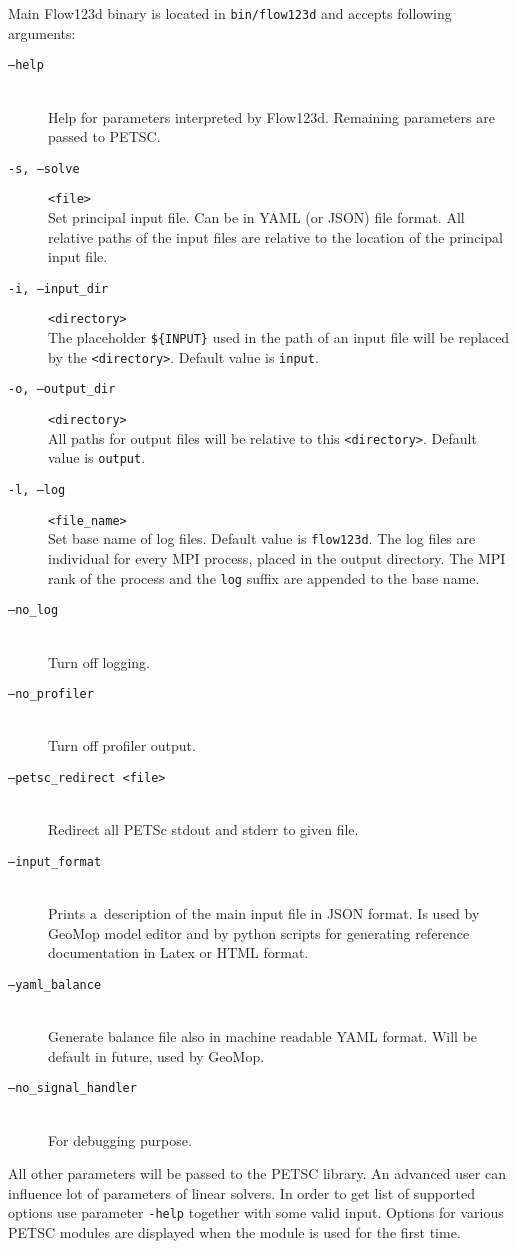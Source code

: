 \documentclass[12pt,a4paper]{report}
\begin{document}
Main Flow123d binary is located in \verb'bin/flow123d' and accepts following arguments:


\begin{description}
 \item[{\tt --help}] \hfill\\
        Help for parameters interpreted by Flow123d. Remaining parameters are passed to PETSC.
 \item[ {\tt -s, --solve} ] \verb'<file>' \hfill\\
 	 Set principal input file. Can be in YAML (or  JSON) file format. All relative paths of the input 
 	 files are relative to the location of the principal input file.
 \item[{\tt -i, --input\_dir}] \verb'<directory>' \hfill\\
 	The placeholder \verb"${INPUT}" %
  	used in the path of an input file will be replaced by the \verb'<directory>'. Default value is \verb'input'.
 \item[{\tt -o, --output\_dir}] \verb'<directory>' \hfill\\
 	All paths for output files will be relative to this \verb'<directory>'. Default value is \verb'output'.
 \item[{\tt -l, --log}] \verb'<file_name>' \hfill\\
 	Set base name of log files. Default value is \verb'flow123d'. The log files are individual for every MPI process, placed in the output directory. 
 	The MPI rank of the process and the \verb'log' suffix are appended to the base name.
 \item[{\tt --no\_log}] \hfill\\
        Turn off logging.
 \item[{\tt --no\_profiler}] \hfill\\
        Turn off profiler output.
 \item[{\tt --petsc\_redirect <file>}] \hfill\\
        Redirect all PETSc stdout and stderr to given file.       
 \item[{\tt --input\_format}] \hfill\\ 
        Prints a~description of the main input file in JSON format. Is used by GeoMop model editor and by python scripts for 
        generating reference documentation in Latex or HTML format.
 \item[{\tt --yaml\_balance}] \hfill\\
        Generate balance file also in machine readable YAML format. Will be default in future, used by GeoMop.
 \item[{\tt --no\_signal\_handler}] \hfill\\
        For debugging purpose.
        
\end{description}
All other parameters will be passed to the PETSC library. An advanced user can influence lot of parameters of linear solvers. In order to get list of supported options 
use parameter \verb'-help' together with some valid input. Options for various PETSC modules are displayed when the module is used for the first time.
\end{document}
